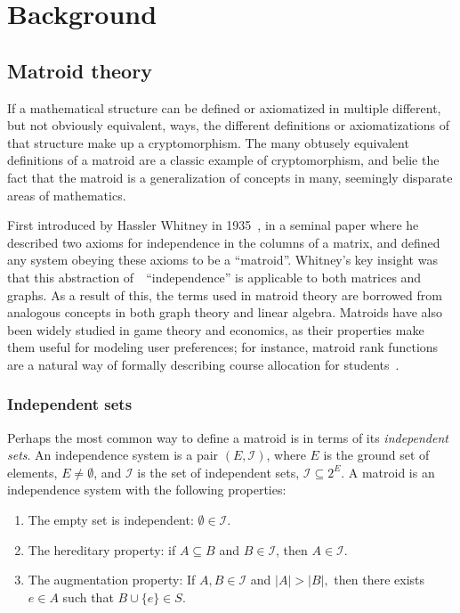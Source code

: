 \chapter{Background}

\section{Matroid theory}
If a mathematical structure can be defined or axiomatized in multiple different, but not obviously equivalent, ways, the different definitions or axiomatizations of that structure make up a cryptomorphism. The many obtusely equivalent definitions of a matroid are a classic example of cryptomorphism, and belie the fact that the matroid is a generalization of concepts in many, seemingly disparate areas of mathematics.

First introduced by Hassler Whitney in 1935~\cite{whitney-1935}, in a seminal paper where he described two axioms for independence in the columns of a matrix, and defined any system obeying these axioms to be a ``matroid''. Whitney's key insight was that this abstraction of~~``independence'' is applicable to both matrices and graphs. As a result of this, the terms used in matroid theory are borrowed from analogous concepts in both graph theory and linear algebra. Matroids have also been widely studied in game theory and economics, as their properties make them useful for modeling user preferences; for instance, matroid rank functions are a natural way of formally describing course allocation for students~\cite{benabbou-2021}. 

\subsection*{Independent sets}
Perhaps the most common way to define a matroid is in terms of its \textit{independent sets}. An independence system is a pair $(E, \mathcal{I})$, where $E$ is the ground set of elements, $E \not= \emptyset$, and $\mathcal{I}$ is the set of independent sets, $\mathcal{I} \subseteq 2^E$. A matroid is an independence system with the following properties:

\begin{enumerate}
  \item The empty set is independent: $\emptyset \in \mathcal{I}$.
  \item The hereditary property: if $A \subseteq B$ and $B \in \mathcal{I}$, then $A \in \mathcal{I}$.
  \item The augmentation property: If $A, B \in \mathcal{I}$ and $|A| > |B|,$ then there exists $e \in A$ such that $B \cup \{e\} \in S$.
\end{enumerate}

